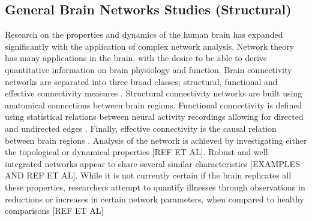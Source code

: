 \documentclass[11pt]{article}
\begin{document}
\subsection{General Brain Networks Studies (Structural)}
Research on the properties and dynamics of the human brain has expanded significantly with the application of complex network analysis. Network theory has many applications in the brain, with the desire to be able to derive quantitative information on brain physiology and function. Brain connectivity networks are separated into three broad classes; structural, functional and effective connectivity measures \citet{fornito2013graph}. Structural connectivity networks are built using anatomical connections between brain regions. Functional connectivity is defined using statistical relations between neural activity recordings allowing for directed and undirected edges \citet{friston}. Finally, effective connectivity is the causal relation between brain regions \citet{fornito2013graph}. Analysis of the network is achieved by investigating either the topological or dynamical properties [REF ET AL]. Robust and well integrated networks appear to share several similar characteristics [EXAMPLES AND REF ET AL]. While it is not currently certain if the brain replicates all these properties, researchers attempt to quantify illnesses through observations in reductions or increases in certain network parameters, when compared to healthy comparisons [REF ET AL] \\
\\
\end{document}
